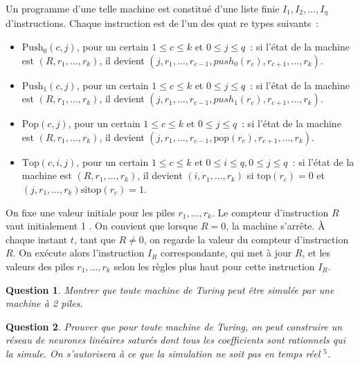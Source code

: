 \documentclass[10pt]{article}
\newtheorem{question}{Question}
\begin{document}
Un programme d'une telle machine est constitué d'une liste finie $I_{1}, I_{2}, \ldots, I_{\eta}$ d'instructions. Chaque instruction est de l'un des quat re types suivants :

\begin{itemize}
  \item $\mathrm{Push}_{0}(c, j)$, pour un certain $1 ≤ c ≤ k$ et $0 ≤ j ≤ q$ : si l'état de la machine est $\left(R, r_{1}, \ldots, r_{k}\right)$, il devient $\left(j, r_{1}, \ldots, r_{c-1}, p u s h_{0}\left(r_{c}\right), r_{c+1}, \ldots, r_{k}\right)$.

  \item $\mathrm{Push}_{1}(c, j)$, pour un certain $1 ≤ c ≤ k$ et $0 ≤ j ≤ q$ : si l'état de la machine est $\left(R, r_{1}, \ldots, r_{k}\right)$, il devient $\left(j, r_{1}, \ldots, r_{c-1}, p u s h_{1}\left(r_{c}\right), r_{c+1}, \ldots, r_{k}\right)$.

  \item $\mathrm{Pop}(c, j)$, pour un certain $1 ≤ c ≤ k$ et $0 ≤ j ≤ q$ : si l'état de la machine est $\left(R, r_{1}, \ldots, r_{k}\right)$, il devient $\left(j, r_{1}, \ldots, r_{c-1}, \mathrm{pop}\left(r_{c}\right), r_{c+1}, \ldots, r_{k}\right)$.

  \item $\mathrm{Top}(c, i, j)$, pour un certain $1 ≤ c ≤ k$ et $0 ≤ i ≤ q, 0 ≤ j ≤ q$ : si l'état de la machine est $\left(R, r_{1}, \ldots, r_{k}\right)$, il devient $\left(i, r_{1}, \ldots, r_{k}\right)$ si $\mathrm{top}\left(r_{c}\right)=0$ et $\left(j, r_{1}, \ldots, r_{k}\right) \mathrm{si} \mathrm{top}\left(r_{c}\right)=1$.

\end{itemize}

On fixe une valeur initiale pour les piles $r_{1}, \ldots, r_{k}$. Le compteur d'instruction $R$ vaut initialement 1 . On convient que lorsque $R=0$, la machine s'arrête. À chaque instant $t$, tant que $R \neq 0$, on regarde la valeur du compteur d'instruction $R$. On exécute alors l'instruction $I_{R}$ correspondante, qui met à jour $R$, et les valeurs des piles $r_{1}, \ldots, r_{k}$ selon les règles plus haut pour cette instruction $I_{R}$.

\begin{question}
	Montrer que toute machine de Turing peut être simulée par une machine à 2 piles.
\end{question}

\begin{question}
	Prouver que pour toute machine de Turing, on peut construire un réseau de neurones linéaires saturés dont tous les coefficients sont rationnels qui la simule. On s'autorisera à ce que la simulation ne soit pas en temps réel ${ }^{5}$.
\end{question}
\end{document}
